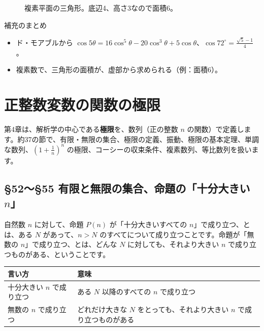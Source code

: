 \documentclass[a4paper,11pt,openany]{ltjsbook}
\begin{document}
\begin{figure}[htbp]
\centering
{}
\caption{複素平面の三角形。底辺4、高さ3なので面積6。}
\end{figure}

\begin{pointbox}{補充のまとめ}
\begin{itemize}[leftmargin=*]
\item ド・モアブルから $\cos5\theta=16\cos^5\theta-20\cos^3\theta+5\cos\theta$、$\cos72^\circ=\tfrac{\sqrt5-1}4$。
\item 複素数で、三角形の面積が、虚部から求められる（例：面積6）。
\end{itemize}
\end{pointbox}

\chapter{正整数変数の関数の極限}

第4章は、解析学の中心である\textbf{極限}を、数列（正の整数 $n$ の関数）で定義します。約37の節で、有限・無限の集合、極限の定義、振動、極限の基本定理、単調な数列、$\left(1+\frac1n\right)^n$ の極限、コーシーの収束条件、複素数列、等比数列を扱います。

\section{§52〜§55 有限と無限の集合、命題の「十分大きい $n$」}

自然数 $n$ に対して、命題 $P(n)$ が「十分大きいすべての $n$」で成り立つ、とは、ある $N$ があって、$n>N$ のすべてについて成り立つことです。命題が「無数の $n$」で成り立つ、とは、どんな $N$ に対しても、それより大きい $n$ で成り立つものがある、ということです。

\begin{center}
\begin{tabular}{lp{8cm}}
\toprule
言い方 & 意味\\
\midrule
十分大きい $n$ で成り立つ & ある $N$ 以降のすべての $n$ で成り立つ\\
無数の $n$ で成り立つ & どれだけ大きな $N$ をとっても、それより大きい $n$ で成り立つものがある\\
\bottomrule
\end{tabular}
\end{center}
\end{document}
